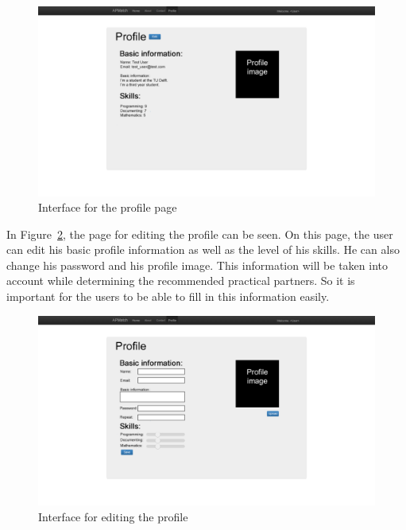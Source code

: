 \begin{figure}[H]
    \centering
    \captionsetup{justification=centering}
    \includegraphics[width=\textwidth, frame]{images/mockup_profile}
    \caption{Interface for the profile page}
    \label{mockup_profile}
\end{figure}

In Figure~\ref{mockup_edit_profile}, the page for editing the profile can be seen.
On this page, the user can edit his basic profile information as well as the level of his skills.
He can also change his password and his profile image.
This information will be taken into account while determining the recommended practical partners.
So it is important for the users to be able to fill in this information easily.

\begin{figure}[H]
    \centering
    \captionsetup{justification=centering}
    \includegraphics[width=\textwidth, frame]{images/mockup_edit_profile}
    \caption{Interface for editing the profile}
    \label{mockup_edit_profile}
\end{figure}


